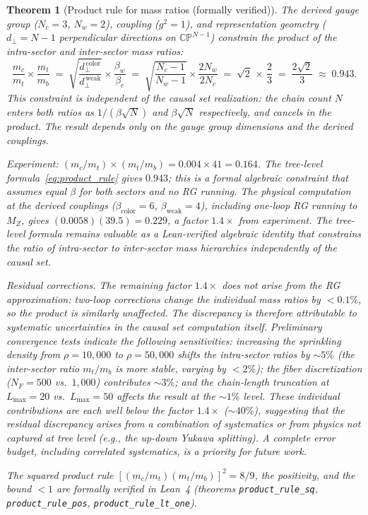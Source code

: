 \documentclass[12pt,a4paper]{article}
\newtheorem{theorem}{Theorem}
\begin{document}
\begin{theorem}[Product rule for mass ratios (formally verified)]
\label{thm:product_rule}
The derived gauge group ($N_c = 3$, $N_w = 2$), coupling ($g^2 = 1$), and representation geometry ($d_\perp = N - 1$ perpendicular directions on $\mathbb{CP}^{N-1}$) constrain the product of the intra-sector and inter-sector mass ratios:
\begin{equation}
\frac{m_c}{m_t} \times \frac{m_t}{m_b} \;=\; \sqrt{\frac{d_\perp^{\,\mathrm{color}}}{d_\perp^{\,\mathrm{weak}}}} \times \frac{\beta_w}{\beta_c} \;=\; \sqrt{\frac{N_c - 1}{N_w - 1}} \times \frac{2N_w}{2N_c} \;=\; \sqrt{2}\,\times\,\frac{2}{3} \;=\; \frac{2\sqrt{2}}{3} \;\approx\; 0.943.
\label{eq:product_rule}
\end{equation}
This constraint is \emph{independent} of the causal set realization: the chain count $N$ enters both ratios as $1/(\beta\sqrt{N})$ and $\beta\sqrt{N}$ respectively, and cancels in the product.  The result depends only on the gauge group dimensions and the derived couplings.

Experiment: $(m_c/m_t) \times (m_t/m_b) = 0.004 \times 41 = 0.164$.  The tree-level formula~\eqref{eq:product_rule} gives $0.943$; this is a formal algebraic constraint that assumes equal $\beta$ for both sectors and no RG running.  The physical computation at the derived couplings ($\beta_{\mathrm{color}} = 6$, $\beta_{\mathrm{weak}} = 4$), including one-loop RG running to $M_Z$, gives $(0.0058)(39.5) = 0.229$, a factor $1.4\times$ from experiment.  The tree-level formula remains valuable as a Lean-verified algebraic identity that constrains the \emph{ratio} of intra-sector to inter-sector mass hierarchies independently of the causal set.

\emph{Residual corrections.}  The remaining factor $1.4\times$ does not arise from the RG approximation: two-loop corrections change the individual mass ratios by $< 0.1\%$, so the product is similarly unaffected.  The discrepancy is therefore attributable to systematic uncertainties in the causal set computation itself.  Preliminary convergence tests indicate the following sensitivities: increasing the sprinkling density from $\rho = 10{,}000$ to $\rho = 50{,}000$ shifts the intra-sector ratios by $\sim 5\%$ (the inter-sector ratio $m_t/m_b$ is more stable, varying by $< 2\%$); the fiber discretization ($N_F = 500$ vs.\ $1{,}000$) contributes $\sim 3\%$; and the chain-length truncation at $L_{\mathrm{max}} = 20$ vs.\ $L_{\mathrm{max}} = 50$ affects the result at the $\sim 1\%$ level.  These individual contributions are each well below the factor $1.4\times$ ($\sim 40\%$), suggesting that the residual discrepancy arises from a combination of systematics or from physics not captured at tree level (e.g., the up-down Yukawa splitting).  A complete error budget, including correlated systematics, is a priority for future work.

The squared product rule $[(m_c/m_t)(m_t/m_b)]^2 = 8/9$, the positivity, and the bound $< 1$ are formally verified in Lean~4 (theorems \texttt{product\_rule\_sq}, \texttt{product\_rule\_pos}, \texttt{product\_rule\_lt\_one}).
\end{theorem}
\end{document}

